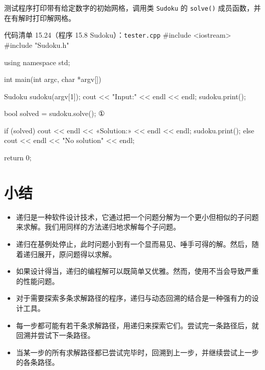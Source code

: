 测试程序打印带有给定数字的初始网格，调用类 \texttt{Sudoku} 的 \texttt{solve()} 成员函数，并在有解时打印解网格。

\begin{codeboxt}{代码清单 15.24（程序 15.8 Sudoku）：\texttt{tester.\allowbreak{}cpp}}
#include <iostream>
#include "Sudoku.h"

using namespace std;

int main(int argc, char *argv[])
{
    Sudoku sudoku(argv[1]);
    cout << "Input:" << endl << endl;
    sudoku.print();

    bool solved = sudoku.solve();                 ①

    if (solved)
    {
        cout << endl << «Solution:» << endl << endl;
        sudoku.print();
    }
    else
    {
        cout << endl << "No solution" << endl;
    }

    return 0;
}
\end{codeboxt}
\par


\section*{小结}

\begin{itemize}
\item 递归是一种软件设计技术，它通过把一个问题分解为一个更小但相似的子问题来求解。我们用同样的方法递归地求解每个子问题。
\item 递归在基例处停止，此时问题小到有一个显而易见、唾手可得的解。然后，随着递归展开，原问题得以求解。
\item 如果设计得当，递归的编程解可以既简单又优雅。然而，使用不当会导致严重的性能问题。
\item 对于需要探索多条求解路径的程序，递归与动态回溯的结合是一种强有力的设计工具。
\item 每一步都可能有若干条求解路径，用递归来探索它们。尝试完一条路径后，就回溯并尝试下一条路径。
\item 当某一步的所有求解路径都已尝试完毕时，回溯到上一步，并继续尝试上一步的各条路径。
\end{itemize}
